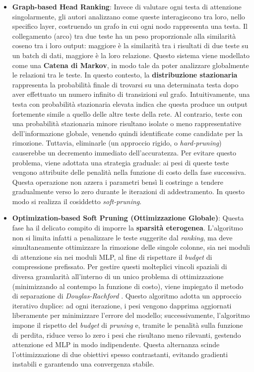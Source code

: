 \begin{itemize}
    \item \textbf{Graph-based Head Ranking}: Invece di valutare ogni testa di attenzione singolarmente, gli autori analizzano come queste interagiscono tra loro, nello specifico layer, costruendo un grafo in cui ogni nodo rappresenta una testa. Il collegamento (arco) tra due teste ha un peso proporzionale alla similarità coseno tra i loro output: maggiore è la similarità tra i risultati di due teste su un batch di dati, maggiore è la loro relazione. Questo sistema viene modellato come una \textbf{Catena di Markov}, in modo tale da poter analizzare globalmente le relazioni tra le teste. In questo contesto, la \textbf{distribuzione stazionaria} rappresenta la probabilità finale di trovarsi su una determinata testa dopo aver effettuato un numero infinito di transizioni sul grafo. Intuitivamente, una testa con probabilità stazionaria elevata indica che questa produce un output fortemente simile a quello delle altre teste della rete. Al contrario, teste con una probabilità stazionaria minore risultano isolate o meno rappresentative dell'informazione globale, venendo quindi identificate come candidate per la rimozione. Tuttavia, eliminarle (un approccio rigido, o \textit{hard-pruning}) causerebbe un decremento immediato dell'accuratezza. Per evitare questo problema, viene adottata una strategia graduale: ai pesi di queste teste vengono attribuite delle penalità nella funzione di costo della fase successiva. Questa operazione non azzera i parametri bensì li costringe a tendere gradualmente verso lo zero durante le iterazioni di addestramento. In questo modo si realizza il cosiddetto \textit{soft-pruning}.

    \item \textbf{Optimization-based Soft Pruning (Ottimizzazione Globale)}: Questa fase ha il delicato compito di imporre la \textbf{sparsità eterogenea}. L'algoritmo non si limita infatti a penalizzare le teste suggerite dal \textit{ranking}, ma deve simultaneamente ottimizzare la rimozione delle singole colonne, sia nei moduli di attenzione sia nei moduli MLP, al fine di rispettare il \textit{budget} di compressione prefissato. Per gestire questi molteplici vincoli spaziali di diversa granularità all'interno di un unico problema di ottimizzazione (minimizzando al contempo la funzione di costo), viene impiegato il metodo di separazione di \textit{Douglas-Rachford} \cite{eckstein1992douglas}. Questo algoritmo adotta un approccio iterativo duplice: ad ogni iterazione, i pesi vengono dapprima aggiornati liberamente per minimizzare l'errore del modello; successivamente, l'algoritmo impone il rispetto del \textit{budget} di \textit{pruning} e, tramite le penalità sulla funzione di perdita, riduce verso lo zero i pesi che risultano meno rilevanti, gestendo attenzione ed MLP in modo indipendente. Questa alternanza scinde l'ottimizzazione di due obiettivi spesso contrastanti, evitando gradienti instabili e garantendo una convergenza stabile.


\end{itemize}
